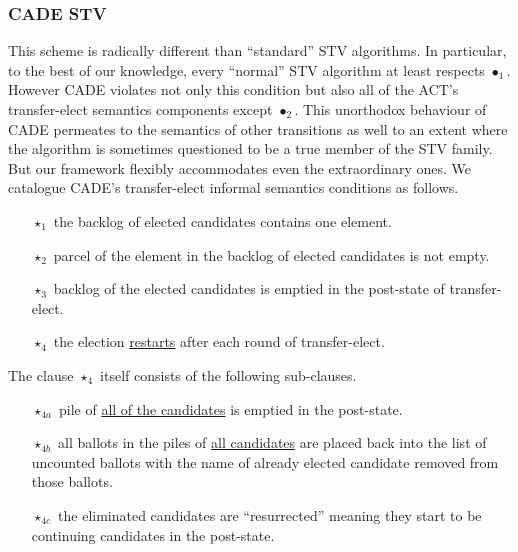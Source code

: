 \documentclass[10pt,conference]{IEEEtran}
\begin{document}
\subsubsection{CADE STV}
This scheme is radically different than ``standard'' STV algorithms. In particular, to the best of our knowledge, every ``normal'' STV algorithm at least respects $\bullet_{1}$. However CADE violates not only this condition but also all of the ACT's transfer-elect semantics components except $\bullet_{2}$. This unorthodox behaviour of CADE permeates to the semantics of other transitions as well to an extent where the algorithm is sometimes questioned to be a true member  of the STV family. But our framework flexibly  accommodates even the extraordinary ones. We catalogue CADE's transfer-elect informal semantics  conditions as follows.
\begin{itemize}
\item[$\star_{1}$] the backlog of  elected candidates contains one element.
\item[$\star_{2}$] parcel of the element in the backlog of elected candidates is not empty.
\item[$\star_{3}$] backlog of the elected candidates is emptied in the post-state of transfer-elect.
\item[$\star_{4}$] the election \underline{restarts} after each round of transfer-elect.
\end{itemize}  
The clause $\star_{4}$ itself consists of the following sub-clauses.
\begin{itemize}
\item[$\star_{4a}$] pile of \underline{all of the candidates} is emptied in the post-state.
\item[$\star_{4b}$] all ballots in the piles of \underline{all candidates} are placed back into the list of uncounted ballots with the name of already elected candidate removed from those ballots.
\item[$\star_{4c}$] the eliminated candidates are ``resurrected'' meaning they start to be continuing candidates in the post-state.  
\end{itemize}
\end{document}

